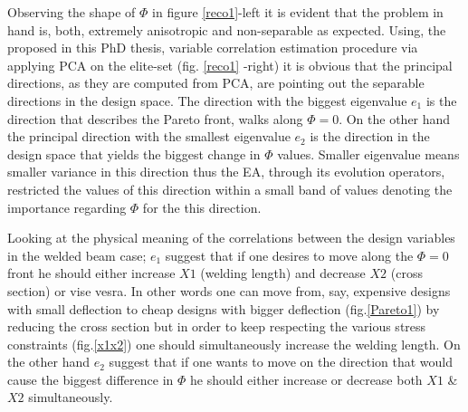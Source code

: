  
Observing the shape of $\Phi$ in figure \ref{reco1}-left it is evident that the problem in hand is, both, extremely anisotropic and non-separable as expected. Using, the proposed in this PhD thesis, variable correlation estimation procedure via applying PCA on the elite-set (fig. \ref{reco1} -right) it is obvious that the principal directions, as they are computed from PCA, are pointing out the separable directions in the design space. The direction with the biggest eigenvalue $e_1$ is the direction that describes the Pareto front, walks along $\Phi=0$. On the other hand the principal direction with the smallest eigenvalue $e_2$ is the direction in the design space that yields the biggest change in $\Phi$ values. Smaller eigenvalue means smaller variance in this direction thus the EA, through its evolution operators, restricted the values of this direction within a small band of values denoting the importance regarding $\Phi$ for the this direction. 

Looking at the physical meaning of the correlations between the design variables in the welded beam case; $e_1$ suggest that if one desires to move along the  $\Phi=0$ front he should either increase $X1$ (welding length) and decrease $X2$ (cross section) or vise vesra. In other words one can move from, say, expensive designs with small deflection to cheap designs with bigger deflection (fig.\ref{Pareto1}) by reducing the cross section but in order to keep respecting the various stress constraints (fig.\ref{x1x2}) one should simultaneously increase the welding length. On the other hand $e_2$ suggest that if one wants to move on the direction that would cause the biggest difference in $\Phi$ he should either increase or decrease both $X1$ \& $X2$ simultaneously.          

